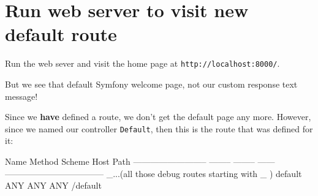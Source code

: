 \documentclass[a4paperpaper,openright]{book}
\newenvironment{Shaded}{}{}
\newcommand{\AnnotationTok}[1]{\textcolor[rgb]{0.38,0.63,0.69}{\textbf{\textit{#1}}}}
\newcommand{\CommentTok}[1]{\textcolor[rgb]{0.38,0.63,0.69}{\textit{#1}}}
\newcommand{\ExtensionTok}[1]{#1}
\newcommand{\KeywordTok}[1]{\textcolor[rgb]{0.00,0.44,0.13}{\textbf{#1}}}
\newcommand{\NormalTok}[1]{#1}
\newcommand{\OtherTok}[1]{\textcolor[rgb]{0.00,0.44,0.13}{#1}}
\newcommand{\StringTok}[1]{\textcolor[rgb]{0.25,0.44,0.63}{#1}}
\begin{document}
\begin{Shaded}
\end{Shaded}

\hypertarget{run-web-server-to-visit-new-default-route}{%
\section{Run web server to visit new default
route}\label{run-web-server-to-visit-new-default-route}}

Run the web sever and visit the home page at
\texttt{http://localhost:8000/}.

But we see that default Symfony welcome page, not our custom response
text message!

Since we \textbf{have} defined a route, we don't get the default page
any more. However, since we named our controller \texttt{Default}, then
this is the route that was defined for it:

\begin{Shaded}
\begin{Highlighting}[]
  \ExtensionTok{Name}\NormalTok{                       Method   Scheme   Host   Path}
 \ExtensionTok{--------------------------}\NormalTok{ -------- -------- ------ -----------------------------------}
  \ExtensionTok{_...}\NormalTok{(all those debug routes starting with _ )}
  \ExtensionTok{default}\NormalTok{                    ANY      ANY      ANY    /default}
\end{Highlighting}
\end{Shaded}
\end{document}
